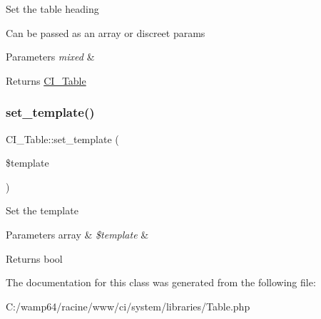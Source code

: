 Set the table heading

Can be passed as an array or discreet params


\begin{DoxyParams}{Parameters}
{\em mixed} & \\
\hline
\end{DoxyParams}
\begin{DoxyReturn}{Returns}
\mbox{\hyperlink{class_c_i___table}{C\+I\+\_\+\+Table}} 
\end{DoxyReturn}
\mbox{\label{class_c_i___table_a2dd144ee26a9abb20dbf71555716d2d4}} 
\subsubsection{\texorpdfstring{set\+\_\+template()}{set\_template()}}
{\footnotesize\ttfamily C\+I\+\_\+\+Table\+::set\+\_\+template (\begin{DoxyParamCaption}\item[{}]{\$template }\end{DoxyParamCaption})}

Set the template


\begin{DoxyParams}[1]{Parameters}
array & {\em \$template} & \\
\hline
\end{DoxyParams}
\begin{DoxyReturn}{Returns}
bool 
\end{DoxyReturn}


The documentation for this class was generated from the following file\+:\begin{DoxyCompactItemize}
\item 
C\+:/wamp64/racine/www/ci/system/libraries/Table.\+php\end{DoxyCompactItemize}
